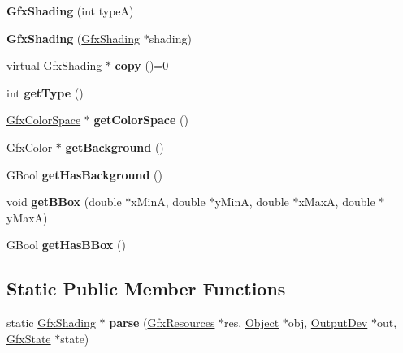 \begin{DoxyCompactItemize}
\item 
\mbox{\label{class_gfx_shading_ae8220eb0ca269e5978ed025e9a7bb3aa}} 
{\bfseries Gfx\+Shading} (int typeA)
\item 
\mbox{\label{class_gfx_shading_a61d4213032d1e47267e892e10a0bfb3e}} 
{\bfseries Gfx\+Shading} (\hyperlink{class_gfx_shading}{Gfx\+Shading} $\ast$shading)
\item 
\mbox{\label{class_gfx_shading_a87c503be9e88eeae20b72b43d8994ebb}} 
virtual \hyperlink{class_gfx_shading}{Gfx\+Shading} $\ast$ {\bfseries copy} ()=0
\item 
\mbox{\label{class_gfx_shading_a96828f669182ffa830aa1487fcfc4860}} 
int {\bfseries get\+Type} ()
\item 
\mbox{\label{class_gfx_shading_a5f1b911aa273b748b7fee90e39398f38}} 
\hyperlink{class_gfx_color_space}{Gfx\+Color\+Space} $\ast$ {\bfseries get\+Color\+Space} ()
\item 
\mbox{\label{class_gfx_shading_a4bb9986ae0bc3852b2026dd4245a4381}} 
\hyperlink{struct_gfx_color}{Gfx\+Color} $\ast$ {\bfseries get\+Background} ()
\item 
\mbox{\label{class_gfx_shading_afd321fbde1ada065be836f1dc2c493fb}} 
G\+Bool {\bfseries get\+Has\+Background} ()
\item 
\mbox{\label{class_gfx_shading_a39a3c718f7e4f40cee684cf4b40c9146}} 
void {\bfseries get\+B\+Box} (double $\ast$x\+MinA, double $\ast$y\+MinA, double $\ast$x\+MaxA, double $\ast$y\+MaxA)
\item 
\mbox{\label{class_gfx_shading_abcf6514cc4ac9d89c3a67ba74c21cfdc}} 
G\+Bool {\bfseries get\+Has\+B\+Box} ()
\end{DoxyCompactItemize}
\subsection*{Static Public Member Functions}
\begin{DoxyCompactItemize}
\item 
\mbox{\label{class_gfx_shading_a2c8f395f32cd9ac5051ab5ba21b8e074}} 
static \hyperlink{class_gfx_shading}{Gfx\+Shading} $\ast$ {\bfseries parse} (\hyperlink{class_gfx_resources}{Gfx\+Resources} $\ast$res, \hyperlink{class_object}{Object} $\ast$obj, \hyperlink{class_output_dev}{Output\+Dev} $\ast$out, \hyperlink{class_gfx_state}{Gfx\+State} $\ast$state)
\end{DoxyCompactItemize}
